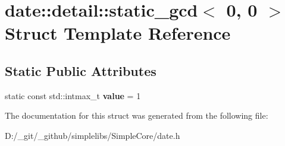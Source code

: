 \hypertarget{structdate_1_1detail_1_1static__gcd_3_010_00_010_01_4}{}\section{date\+::detail\+::static\+\_\+gcd$<$ 0, 0 $>$ Struct Template Reference}
\label{structdate_1_1detail_1_1static__gcd_3_010_00_010_01_4}
\subsection*{Static Public Attributes}
\begin{DoxyCompactItemize}
\item 
\mbox{\label{structdate_1_1detail_1_1static__gcd_3_010_00_010_01_4_ab608cc9c28ae6db10cb059a9f07f0bbe}} 
static const std\+::intmax\+\_\+t {\bfseries value} = 1
\end{DoxyCompactItemize}


The documentation for this struct was generated from the following file\+:\begin{DoxyCompactItemize}
\item 
D\+:/\+\_\+git/\+\_\+github/simplelibs/\+Simple\+Core/date.\+h\end{DoxyCompactItemize}
